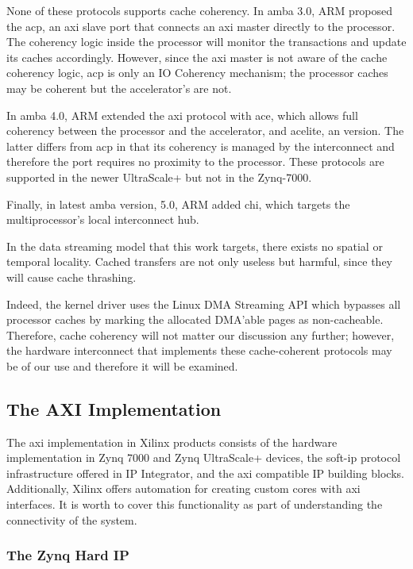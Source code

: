 None of these protocols supports cache coherency. 
In \gls{amba} 3.0, ARM proposed the \gls{acp}, 
an \gls{axi} slave port that connects an \gls{axi} master directly to the processor.
The coherency logic inside the processor 
will monitor the transactions and update its caches accordingly.
However, since the \gls{axi} master is not aware of the cache coherency logic, 
\gls{acp} is only an \gls{IO Coherency} mechanism;
the processor caches may be coherent but the accelerator's are not.

In \gls{amba} 4.0, ARM extended the \gls{axi} protocol with \gls{ace}, 
which allows full coherency between the processor and the accelerator, 
and \gls{acelite}, an  version.
The latter differs from \gls{acp} in that its coherency is managed
by the interconnect and therefore the port requires no proximity
to the processor. 
These protocols are supported in the newer UltraScale+ but not in the Zynq-7000.

Finally, in latest \gls{amba} version, 5.0, ARM added \gls{chi}, 
which targets the multiprocessor's local interconnect hub.

In the data streaming model that this work targets, 
there exists no spatial or temporal locality. 
Cached transfers are not only useless but harmful, 
since they will cause cache thrashing. 

Indeed, the kernel driver uses the Linux DMA Streaming API
which bypasses all processor caches by marking 
the allocated DMA'able pages as non-cacheable.
Therefore, cache coherency will not matter our discussion any further;
however, the hardware interconnect that implements these cache-coherent
protocols may be of our use and therefore it will be examined.

\subsection{The AXI Implementation}

The \gls{axi} implementation in Xilinx products consists of the hardware 
implementation in Zynq 7000 and Zynq UltraScale+ devices,
the \gls{soft-ip} protocol infrastructure offered in IP Integrator, 
and the \gls{axi} compatible IP building blocks. 
Additionally, Xilinx offers automation for creating 
custom cores with \gls{axi} interfaces.
It is worth to cover this functionality as 
part of understanding the connectivity of the system.

\subsubsection{The Zynq Hard IP}

